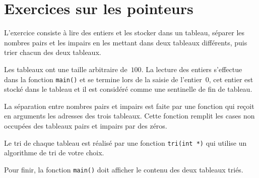 \section{Exercices sur les pointeurs}
L'exercice consiste   \`a  lire des entiers  et   les stocker  dans un
tableau, s\'eparer  les nombres  pairs  et les  impairs en les mettant
dans deux tableaux diff\'erents, puis trier chacun des deux tableaux.
\par
Les tableaux ont une taille arbitraire de~$100$. La lecture des entiers
s'effectue dans  la fonction \texttt{main()}  et se termine lors de la
saisie de l'entier~$0$, cet entier est stock\'e dans  le tableau et il
est consid\'er\'e comme une sentinelle de fin de tableau.
\par
La s\'eparation  entre  nombres pairs et  impairs   est faite par  une
fonction qui re\c{c}oit en arguments les  adresses des trois tableaux. 
Cette fonction remplit les cases non occup\'ees  des tableaux pairs et
impairs par des z\'eros.
\par
Le  tri  de  chaque   tableau   est    r\'ealis\'e  par  une    fonction
\texttt{tri(int *)} qui  utilise un algorithme de  tri de votre choix. 
\par
Pour finir,  la fonction \texttt{main()} doit  afficher le contenu des
deux tableaux tri\'es.
